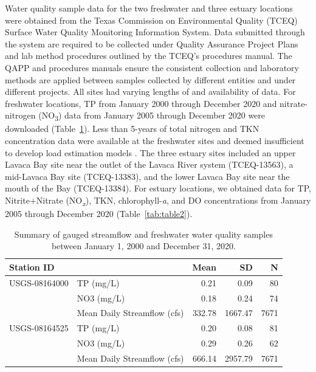 \documentclass[sn-basic,referee,lineno,pdflatex]{sn-jnl}
\begin{document}
Water quality sample data for the two freshwater and three estuary
locations were obtained from the Texas Commission on Environmental
Quality (TCEQ) Surface Water Quality Monitoring Information System. Data
submitted through the system are required to be collected under Quality
Assurance Project Plans and lab method procedures outlined by the TCEQ's
procedures manual. The QAPP and procedures manuals ensure the consistent
collection and laboratory methods are applied between samples collected
by different entities and under different projects. All sites had
varying lengths of and availability of data. For freshwater locations,
TP from January 2000 through December 2020 and nitrate-nitrogen
(NO\textsubscript{3}) data from January 2005 through December 2020 were
downloaded (Table~\ref{tab:table1}). Less than 5-years of total nitrogen
and TKN concentration data were available at the freshwater sites and
deemed insufficient to develop load estimation models
\citep{horowitzEvaluationSedimentRating2003, snelderEstimationCatchmentNutrient2017}.
The three estuary sites included an upper Lavaca Bay site near the
outlet of the Lavaca River system (TCEQ-13563), a mid-Lavaca Bay site
(TCEQ-13383), and the lower Lavaca Bay site near the mouth of the Bay
(TCEQ-13384). For estuary locations, we obtained data for TP,
Nitrite+Nitrate (NO\emph{\textsubscript{x}}), TKN, chlorophyll-\emph{a},
and DO concentrations from January 2005 through December 2020
(Table~\ref{tab:table2}).

\begin{table}

\caption{\label{tab:table1}Summary of gauged streamflow and freshwater water quality samples between January 1, 2000 and December 31, 2020.}
\centering
\begin{tabular}[t]{llrrr}
\toprule
Station ID &   & Mean & SD & N\\
\midrule
USGS-08164000 & TP (mg/L) & \num{0.21} & \num{0.09} & 80\\
 & NO3 (mg/L) & \num{0.18} & \num{0.24} & 74\\
 & Mean Daily Streamflow (cfs) & \num{332.78} & \num{1667.47} & 7671\\
USGS-08164525 & TP (mg/L) & \num{0.20} & \num{0.08} & 81\\
 & NO3 (mg/L) & \num{0.29} & \num{0.26} & 62\\
 & Mean Daily Streamflow (cfs) & \num{666.14} & \num{2957.79} & 7671\\
\bottomrule
\end{tabular}
\end{table}
\end{document}
